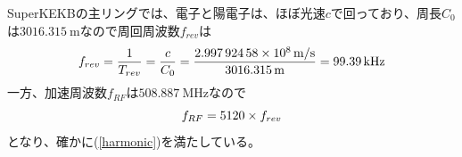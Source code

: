 \documentclass[10pt,a4paper]{ltjsarticle}
\begin{document}
\vspace{\baselineskip}

\begin{tcolorbox}[title=\textgt{SuperKEKBにおける$f_{RF}$, $f_{0}$, $h$}の関係]
  SuperKEKBの主リングでは、電子と陽電子は、ほぼ光速$c$で回っており、周長$C_0$は$\SI{3016.315}{\meter}$なので周回周波数$f_{rev}$は
  \begin{equation}
    f_{rev} = \frac{1}{T_{rev}}=\frac{c}{C_0}=\frac{\SI{2.99792458e8}{\meter / \second}}{\SI{3016.315}{\meter}}=\SI{99.39}{\kilo\hertz} \notag
  \end{equation}
  一方、加速周波数$f_{RF}$は$\SI{508.887}{\mega\hertz}$なので
  \begin{equation}
      f_{RF} = 5120 \times f_{rev} \notag
  \end{equation}
  となり、確かに(\ref{harmonic})を満たしている。
\end{tcolorbox}
\end{document}
